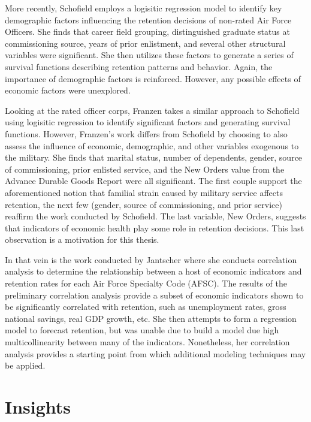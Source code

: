 \documentclass[12pt,letterpaper,toc=flat,oneside]{report}
\theoremstyle{definition}
\theoremstyle{definition}
\theoremstyle{definition}
\theoremstyle{remark}
\begin{document}
More recently, Schofield \cite{schofield-2015} employs a logisitic
regression model to identify key demographic factors influencing the
retention decisions of non-rated Air Force Officers. She finds that
career field grouping, distinguished graduate status at commissioning
source, years of prior enlistment, and several other structural
variables were significant. She then utilizes these factors to generate
a series of survival functions describing retention patterns and
behavior. Again, the importance of demographic factors is reinforced.
However, any possible effects of economic factors were unexplored.

Looking at the rated officer corps, Franzen \cite{franzen-2017} takes a
similar approach to Schofield \cite{schofield-2015} using logisitic
regression to identify significant factors and generating survival
functions. However, Franzen's work differs from Schofield by choosing to
also assess the influence of economic, demographic, and other variables
exogenous to the military. She finds that marital status, number of
dependents, gender, source of commissioning, prior enlisted service, and
the New Orders value from the Advance Durable Goods Report were all
significant. The first couple support the aforementioned notion that
familial strain caused by military service affects retention, the next
few (gender, source of commissioning, and prior service) reaffirm the
work conducted by Schofield. The last variable, New Orders, suggests
that indicators of economic health play some role in retention
decisions. This last observation is a motivation for this thesis.

In that vein is the work conducted by Jantscher \cite{jantscher-2016}
where she conducts correlation analysis to determine the relationship
between a host of economic indicators and retention rates for each Air
Force Specialty Code (AFSC). The results of the preliminary correlation
analysis provide a subset of economic indicators shown to be
significantly correlated with retention, such as unemployment rates,
gross national savings, real GDP growth, etc. She then attempts to form
a regression model to forecast retention, but was unable due to build a
model due high multicollinearity between many of the indicators.
Nonetheless, her correlation analysis provides a starting point from
which additional modeling techniques may be applied.

\hypertarget{insights}{%
\section{Insights}\label{insights}}
\end{document}

